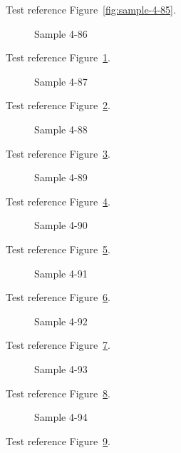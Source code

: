 Test reference Figure~\ref{fig:sample-4-85}.

\begin{figure}[tbhp]
\caption{Sample 4-86}
\label{fig:sample-4-86}
\end{figure}

Test reference Figure~\ref{fig:sample-4-86}.

\begin{figure}[tbhp]
\caption{Sample 4-87}
\label{fig:sample-4-87}
\end{figure}

Test reference Figure~\ref{fig:sample-4-87}.

\begin{figure}[tbhp]
\caption{Sample 4-88}
\label{fig:sample-4-88}
\end{figure}

Test reference Figure~\ref{fig:sample-4-88}.

\begin{figure}[tbhp]
\caption{Sample 4-89}
\label{fig:sample-4-89}
\end{figure}

Test reference Figure~\ref{fig:sample-4-89}.

\begin{figure}[tbhp]
\caption{Sample 4-90}
\label{fig:sample-4-90}
\end{figure}

Test reference Figure~\ref{fig:sample-4-90}.

\begin{figure}[tbhp]
\caption{Sample 4-91}
\label{fig:sample-4-91}
\end{figure}

Test reference Figure~\ref{fig:sample-4-91}.

\begin{figure}[tbhp]
\caption{Sample 4-92}
\label{fig:sample-4-92}
\end{figure}

Test reference Figure~\ref{fig:sample-4-92}.

\begin{figure}[tbhp]
\caption{Sample 4-93}
\label{fig:sample-4-93}
\end{figure}

Test reference Figure~\ref{fig:sample-4-93}.

\begin{figure}[tbhp]
\caption{Sample 4-94}
\label{fig:sample-4-94}
\end{figure}

Test reference Figure~\ref{fig:sample-4-94}.

